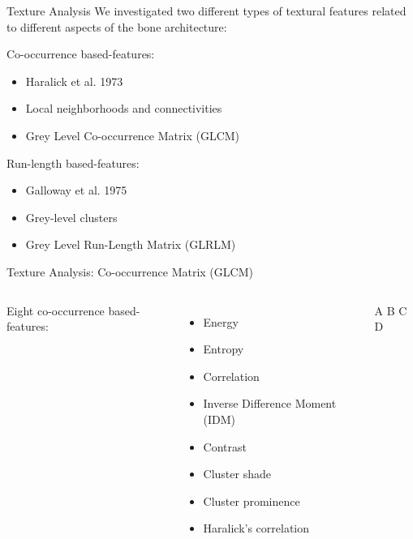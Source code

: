 \documentclass[10pt,aspectratio=169]{beamer}
\begin{document}
\begin{frame}[fragile]{Texture Analysis}
  We investigated two different types of textural features related to different aspects of the bone architecture:
  \vspace{0.1cm}
  \begin{exampleblock}{Co-occurrence based-features:}
    \begin{itemize} \itemsep0.8em
      \item Haralick et al. 1973 \cite{Haralick1973}
      \item Local neighborhoods and connectivities
      \item Grey Level Co-occurrence Matrix (GLCM)
    \end{itemize}
  \end{exampleblock}
  \begin{exampleblock}{Run-length based-features:}
    \begin{itemize} \itemsep0.8em
      \item Galloway et al. 1975 \cite{Galloway1975}
      \item Grey-level clusters
      \item Grey Level Run-Length Matrix (GLRLM)
    \end{itemize}
  \end{exampleblock}
\end{frame}

\begin{frame}{Texture Analysis: Co-occurrence Matrix (GLCM)}
  \begin{columns}[onlytextwidth]
    Eight co-occurrence based-features:
    \begin{itemize} \itemsep0.5em
      \item Energy
      \item Entropy
      \item Correlation
      \item Inverse Difference Moment (IDM)
      \item Contrast
      \item Cluster shade
      \item Cluster prominence
      \item Haralick’s correlation
    \end{itemize}
    \begin{columns}
    \centering
    \centering
    A B
    \centering
    C D
    \end{columns}
  \end{columns}
\end{frame}
\end{document}
